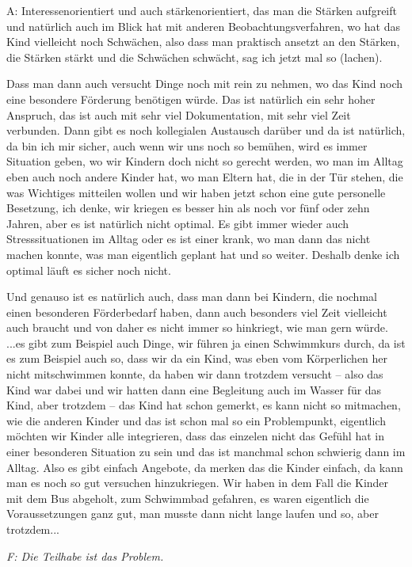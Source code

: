 \begin{linenumbers*}
A: Interessenorientiert und auch stärkenorientiert, das man die Stärken aufgreift und natürlich auch im Blick hat mit anderen Beobachtungsverfahren, wo hat das Kind vielleicht noch Schwächen, also dass man praktisch ansetzt an den Stärken, die Stärken stärkt und die Schwächen schwächt, sag ich jetzt mal so (lachen). 

Dass man dann auch versucht Dinge noch mit rein zu nehmen, wo das Kind noch eine besondere Förderung benötigen würde. Das ist natürlich ein sehr hoher Anspruch, das ist auch mit sehr viel Dokumentation, mit sehr viel Zeit verbunden. Dann gibt es noch kollegialen Austausch darüber und da ist natürlich, da bin ich mir sicher, auch wenn wir uns noch so bemühen, wird es immer Situation geben, wo wir Kindern doch nicht so gerecht werden, wo man im Alltag eben auch noch andere Kinder hat, wo man Eltern hat, die in der Tür stehen, die was Wichtiges mitteilen wollen und wir haben jetzt schon eine gute personelle Besetzung, ich denke, wir kriegen es besser hin als noch vor fünf oder zehn Jahren, aber es ist natürlich nicht optimal. Es gibt immer wieder auch Stresssituationen im Alltag oder es ist einer krank, wo man dann das nicht machen konnte, was man eigentlich geplant hat und so weiter. Deshalb denke ich optimal läuft es sicher noch nicht. 

Und genauso ist es natürlich auch, dass man dann bei Kindern, die nochmal einen besonderen Förderbedarf haben, dann auch besonders viel Zeit vielleicht auch braucht und von daher es nicht immer so hinkriegt, wie man gern würde. ...es gibt zum Beispiel auch Dinge, wir führen ja einen Schwimmkurs durch, da ist es zum Beispiel auch so, dass wir da ein Kind, was eben vom Körperlichen her nicht mitschwimmen konnte, da haben wir dann trotzdem versucht – also das Kind war dabei und wir hatten dann eine Begleitung auch im Wasser für das Kind, aber trotzdem – das Kind hat schon gemerkt, es kann nicht so mitmachen, wie die anderen Kinder und das ist schon mal so ein Problempunkt, eigentlich möchten wir Kinder alle integrieren, dass das einzelen nicht das Gefühl hat in einer besonderen Situation zu sein und das ist manchmal schon schwierig dann im Alltag. Also es gibt einfach Angebote, da merken das die Kinder einfach, da kann man es noch so gut versuchen hinzukriegen. Wir haben in dem Fall die Kinder mit dem Bus abgeholt, zum Schwimmbad gefahren, es waren eigentlich die Voraussetzungen ganz gut, man musste dann nicht lange laufen und so, aber trotzdem...

\emph{F: Die Teilhabe ist das Problem.}


\end{linenumbers*}
